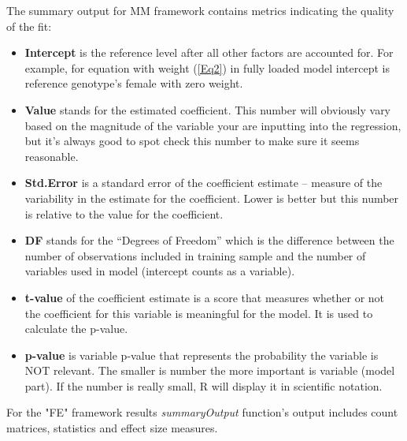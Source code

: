 \documentclass[12pt,a4paper]{article}
\begin{document}
The summary output for MM framework contains metrics indicating the quality of the fit:
\begin{itemize}
\item \textbf{Intercept} is the reference level after all other factors are accounted for. For example, for equation with weight (\ref{Eq2}) in fully loaded model intercept is reference genotype's female with zero weight. 
 \item \textbf{Value} stands for the estimated coefficient. This number will obviously vary based on the magnitude of the variable your are inputting into the regression, but it's always good to spot check this number to make sure it seems reasonable.

\item \textbf{Std.Error} is a standard error of the coefficient estimate -- measure of the variability in the estimate for the coefficient. Lower is better but this number is relative to the value for the coefficient. 

\item \textbf{DF} stands for the ``Degrees of Freedom'' which is the difference between the number of observations included in training sample and the number of variables used in model (intercept counts as a variable).

\item \textbf{t-value} of the coefficient estimate is a score that measures whether or not the coefficient for this variable is meaningful for the model. It is used to calculate the p-value.

\item \textbf{p-value} is variable p-value that represents the probability the variable is NOT relevant. The smaller is number the more important is variable (model part). If the number is really small, R will display it in scientific notation.
\end{itemize}

For the "FE" framework results \textit{summaryOutput} function's output includes count matrices, statistics and effect size measures.
\end{document}
